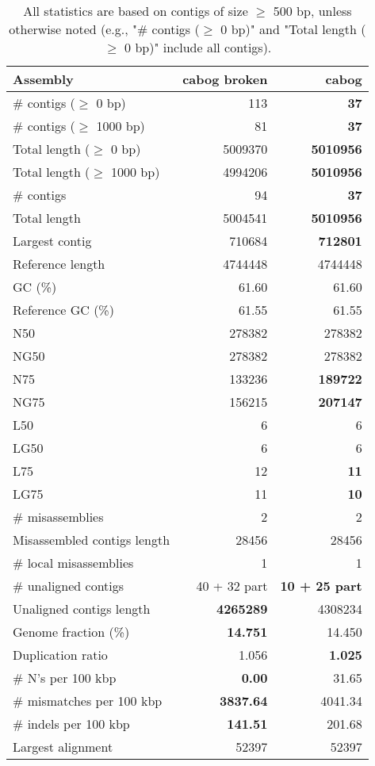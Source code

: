 \documentclass[12pt,a4paper]{article}
\begin{document}
\begin{table}[ht]
\begin{center}
\caption{All statistics are based on contigs of size $\geq$ 500 bp, unless otherwise noted (e.g., "\# contigs ($\geq$ 0 bp)" and "Total length ($\geq$ 0 bp)" include all contigs).}
\begin{tabular}{|l*{2}{|r}|}
\hline
Assembly & cabog broken & cabog \\ \hline
\# contigs ($\geq$ 0 bp) & 113 & {\bf 37} \\ \hline
\# contigs ($\geq$ 1000 bp) & 81 & {\bf 37} \\ \hline
Total length ($\geq$ 0 bp) & 5009370 & {\bf 5010956} \\ \hline
Total length ($\geq$ 1000 bp) & 4994206 & {\bf 5010956} \\ \hline
\# contigs & 94 & {\bf 37} \\ \hline
Total length & 5004541 & {\bf 5010956} \\ \hline
Largest contig & 710684 & {\bf 712801} \\ \hline
Reference length & 4744448 & 4744448 \\ \hline
GC (\%) & 61.60 & 61.60 \\ \hline
Reference GC (\%) & 61.55 & 61.55 \\ \hline
N50 & 278382 & 278382 \\ \hline
NG50 & 278382 & 278382 \\ \hline
N75 & 133236 & {\bf 189722} \\ \hline
NG75 & 156215 & {\bf 207147} \\ \hline
L50 & 6 & 6 \\ \hline
LG50 & 6 & 6 \\ \hline
L75 & 12 & {\bf 11} \\ \hline
LG75 & 11 & {\bf 10} \\ \hline
\# misassemblies & 2 & 2 \\ \hline
Misassembled contigs length & 28456 & 28456 \\ \hline
\# local misassemblies & 1 & 1 \\ \hline
\# unaligned contigs & 40 + 32 part & {\bf 10 + 25 part} \\ \hline
Unaligned contigs length & {\bf 4265289} & 4308234 \\ \hline
Genome fraction (\%) & {\bf 14.751} & 14.450 \\ \hline
Duplication ratio & 1.056 & {\bf 1.025} \\ \hline
\# N's per 100 kbp & {\bf 0.00} & 31.65 \\ \hline
\# mismatches per 100 kbp & {\bf 3837.64} & 4041.34 \\ \hline
\# indels per 100 kbp & {\bf 141.51} & 201.68 \\ \hline
Largest alignment & 52397 & 52397 \\ \hline
\end{tabular}
\end{center}
\end{table}
\end{document}
